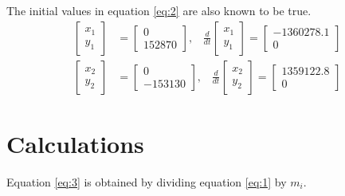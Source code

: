 The initial values in equation \ref{eq:2} are also known to be true.
\begin{equation}
\begin{align*}
\left[ \begin{matrix} x_{ 1 } \\ y_{ 1 } \end{matrix} \right] &=\left[ \begin{matrix} 0 \\ 152870 \end{matrix} \right] ,\;\;\; 
\frac { d }{ dt } \left[ \begin{matrix} x_{ 1 } \\ y_{ 1 } \end{matrix} \right] =\left[ \begin{matrix} -1360278.1 \\ 0 \end{matrix} \right]  \\
\left[ \begin{matrix} x_{ 2 } \\ y_{ 2 } \end{matrix} \right] &=\left[ \begin{matrix} 0 \\ -153130 \end{matrix} \right] ,\; \;\;
\frac { d }{ dt } \left[ \begin{matrix} x_{ 2 } \\ y_{ 2 } \end{matrix} \right] =\left[ \begin{matrix} 1359122.8 \\ 0 \end{matrix} \right] 
\end{align*}
\label{eq:2}
\end{equation}

\noindent\makebox[\linewidth]{\rule{\textwidth}{0.4pt}}

\section{Calculations}
Equation \ref{eq:3} is obtained by dividing equation \ref{eq:1} by $m_i$.

